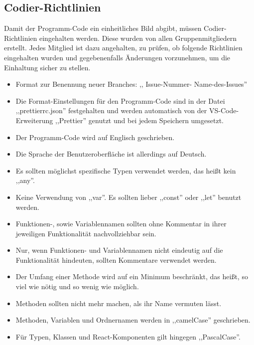\documentclass[conference]{IEEEtran}
\begin{document}
\subsection{Codier-Richtlinien}
Damit der Programm-Code ein einheitliches Bild abgibt, müssen Codier-Richtlinien eingehalten werden. Diese wurden von allen Gruppenmitgliedern erstellt.
Jedes Mitglied ist dazu angehalten, zu prüfen, ob folgende Richtlinien eingehalten wurden und gegebenenfalls Änderungen vorzunehmen, um die Einhaltung sicher zu stellen.
\begin{itemize}
    \item Format zur Benennung neuer \gls{Branches}: ,, \textlangle \gls{Issue}-Nummer\textrangle- \textlangle Name-des-Issues\textrangle''
    \item Die Format-Einstellungen für den Programm-Code sind in der Datei ,,prettierrc.json'' festgehalten und werden automatisch von der \gls{VS-Code}-Erweiterung ,,\gls{Prettier}'' genutzt und bei jedem Speichern umgesetzt.
    \item Der Programm-Code wird auf Englisch geschrieben.
    \item Die Sprache der Benutzeroberfläche ist allerdings auf Deutsch.
    \item Es sollten möglichst spezifische Typen verwendet werden, das heißt kein ,,any''.
    \item Keine Verwendung von ,,var''. Es sollten lieber ,,const'' oder ,,let'' benutzt werden.
    \item Funktionen-, sowie Variablennamen sollten ohne Kommentar in ihrer jeweiligen Funktionalität nachvollziehbar sein.
    \item Nur, wenn Funktionen- und Variablennamen nicht eindeutig auf die Funktionalität hindeuten, sollten Kommentare verwendet werden.
    \item Der Umfang einer Methode wird auf ein Minimum beschränkt, das heißt, so viel wie nötig und so wenig wie möglich.
    \item Methoden sollten nicht mehr machen, als ihr Name vermuten lässt.
    \item Methoden, Variablen und Ordnernamen werden in ,,\gls{camelCase}'' geschrieben.
    \item Für Typen, Klassen und React-Komponenten gilt hingegen ,,\gls{PascalCase}''.
\end{itemize}
\end{document}
